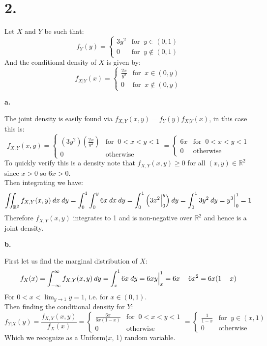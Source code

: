 \documentclass{article}
\begin{document}
\newpage
\section*{2.}
\begin{center}
\doublespacing
    Let $X$ and $Y$ be such that:
    \[f_Y (y) = 
    \begin{cases}
        3y^2 & \mbox{for}\;\; y\in (0, 1) \\
        0 & \mbox{for}\;\; y\notin (0, 1)
    \end{cases}
    \]
    And the conditional density of $X$ is given by:
    \[f_{X|Y} (x) =
    \begin{cases}
        \frac{2x}{y^2} & \mbox{for}\;\; x\in (0, y) \\
        0 & \mbox{for}\;\; x\notin (0, y)
    \end{cases}
    \]
\end{center}

{\Large\textbf{a.}}
\begin{center}
\doublespacing
    The joint density is easily found via $f_{X,Y} (x, y) = f_Y (y) f_{X|Y} (x)$, in this case this is:
    \[f_{X,Y} (x,y) =
    \begin{cases}
        (3y^2)(\frac{2x}{y^2}) & \mbox{for}\;\; 0 < x < y < 1 \\
        0 & \mbox{otherwise}
    \end{cases}
    =
    \begin{cases}
        6x & \mbox{for}\;\; 0 < x < y < 1 \\
        0 & \mbox{otherwise}
    \end{cases}
    \]
    To quickly verify this is a density note that $f_{X,Y} (x, y)\geq 0$ for all $(x,y)\in\mathbb{R}^2$ since $x > 0$ so $6x > 0$.
    \\Then integrating we have:
    \[\iint_{\mathbb{R}^2} f_{X,Y} (x, y)\:dx\:dy =\int_0^1\int_0^y 6x\:dx\:dy =\int_0^1\Big{(} 3x^2\Big{|}_0^y\Big{)}\:dy =\int_0^1 3y^2\:dy =y^3\Big{|}_0^1 = 1\]
    Therefore $f_{X,Y} (x, y)$ integrates to 1 and is non-negative over $\mathbb{R}^2$ and hence is a joint density.
\end{center}

{\Large\textbf{b.}}
\begin{center}
\doublespacing
    First let us find the marginal distribution of $X$:
    \[f_X (x) =\int_{-\infty}^\infty f_{X,Y} (x, y)\:dy =\int_x^1 6x\:dy = 6xy\Big{|}_x^1 = 6x - 6x^2 = 6x(1 - x)\]
    For $0 < x <\lim_{y\rightarrow 1} y = 1$, i.e. for $x\in (0, 1)$.
    \\Then finding the conditional density for $Y$:
    \[f_{Y|X} (y) =\frac{f_{X,Y} (x, y)}{f_X (x)} =
    \begin{cases}
        \frac{6x}{6x(1-x)} & \mbox{for}\;\; 0 < x < y < 1 \\
        0 & \mbox{otherwise}
    \end{cases}
    =
    \begin{cases}
        \frac{1}{1-x} & \mbox{for}\;\; y\in (x, 1) \\
        0 & \mbox{otherwise}
    \end{cases}
    \]
    Which we recognize as a Uniform($x$, 1) random variable.
\end{center}
\end{document}
